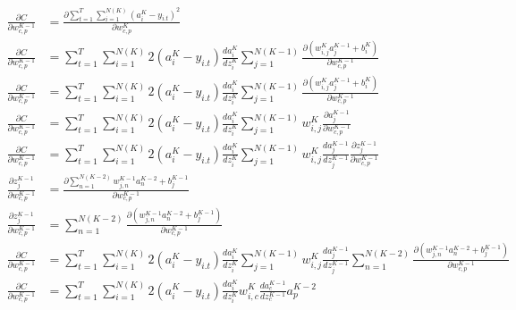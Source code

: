 \documentclass[11pt]{article}
\begin{document}
\begin{align}
\frac{\partial C}{\partial w_{c, p}^{K-1}} &= \frac{\partial\sum_{t=1}^{T} \sum_{i=1}^{N(K)}(a_{i}^{K} - y_{i. t})^{2}}{\partial w_{c, p}^{K}}
\\
\frac{\partial C}{\partial w_{c, p}^{K-1}} &= \sum_{t=1}^{T} \sum_{i=1}^{N(K)} 2(a_{i}^{K} - y_{i. t}) \frac{d a_{i}^{K}}{d z_{i}^{K}}\sum_{j=1}^{N(K-1)} \frac{\partial (w_{i,j}^{K}a_{j}^{K-1} + b_{i}^{K})}{\partial w_{c, p}^{K-1}}
\\
\frac{\partial C}{\partial w_{c, p}^{K-1}} &= \sum_{t=1}^{T} \sum_{i=1}^{N(K)} 2(a_{i}^{K} - y_{i. t}) \frac{d a_{i}^{K}}{d z_{i}^{K}}\sum_{j=1}^{N(K-1)} \frac{\partial (w_{i,j}^{K}a_{j}^{K-1} + b_{i}^{K})}{\partial w_{c, p}^{K-1}}
\\
\frac{\partial C}{\partial w_{c, p}^{K-1}} &= \sum_{t=1}^{T} \sum_{i=1}^{N(K)} 2(a_{i}^{K} - y_{i. t}) \frac{d a_{i}^{K}}{d z_{i}^{K}}\sum_{j=1}^{N(K-1)} w_{i,j}^{K} \frac{\partial a_{j}^{K-1}}{\partial w_{c, p}^{K-1}}
\\
\frac{\partial C}{\partial w_{c, p}^{K-1}} &= \sum_{t=1}^{T} \sum_{i=1}^{N(K)} 2(a_{i}^{K} - y_{i. t}) \frac{d a_{i}^{K}}{d z_{i}^{K}}\sum_{j=1}^{N(K-1)} w_{i,j}^{K} \frac {d a_{j}^{K-1}}{d z_{j}^{K-1}} \frac{\partial z_{j}^{K-1}}{\partial w_{c, p}^{K-1}}
\\
\frac{\partial z_{j}^{K-1}}{\partial w_{c, p}^{K-1}} &= \frac{\partial \sum_{n=1}^{N(K-2)} w_{j,n}^{K-1}a_{n}^{K-2} + b_{j}^{K-1}}{\partial w_{c, p}^{K-1}}
\\
\frac{\partial z_{j}^{K-1}}{\partial w_{c, p}^{K-1}} &= \sum_{n=1}^{N(K-2)} \frac{\partial (w_{j,n}^{K-1}a_{n}^{K-2} + b_{j}^{K-1})}{\partial w_{c, p}^{K-1}}
\\
\frac{\partial C}{\partial w_{c, p}^{K-1}} &= \sum_{t=1}^{T} \sum_{i=1}^{N(K)} 2(a_{i}^{K} - y_{i. t}) \frac{d a_{i}^{K}}{d z_{i}^{K}}\sum_{j=1}^{N(K-1)} w_{i,j}^{K} \frac {d a_{j}^{K-1}}{d z_{j}^{K-1}}\sum_{n=1}^{N(K-2)} \frac{\partial (w_{j,n}^{K-1}a_{n}^{K-2} + b_{j}^{K-1})}{\partial w_{c, p}^{K-1}}
\\
\frac{\partial C}{\partial w_{c, p}^{K-1}} &= \sum_{t=1}^{T} \sum_{i=1}^{N(K)} 2(a_{i}^{K} - y_{i. t}) \frac{d a_{i}^{K}}{d z_{i}^{K}}w_{i,c}^{K} \frac {d a_{c}^{K-1}}{d z_{c}^{K-1}} a_{p}^{K-2}
\end{align}
\end{document}
